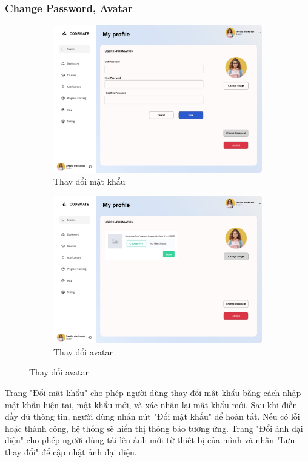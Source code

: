 \subsubsection{Change Password, Avatar}
\begin{figure}[H]
    \centering
    \begin{subfigure}[b]{0.45\linewidth}
        \centering
        \includegraphics[width=\linewidth]{Images/Anh/UI_change_pass.png}
        \caption{Thay đổi mật khẩu}
        \label{fig:enter-label1}
    \end{subfigure}
    \hfill
    \begin{subfigure}[b]{0.45\linewidth}
        \centering
        \includegraphics[width=\linewidth]{Images/Anh/UI_change_avatar.png}
        \caption{Thay đổi avatar}
        \label{fig:enter-label2}
    \end{subfigure}
    \label{fig:enter-label}
\end{figure}
Trang "Đổi mật khẩu" cho phép người dùng thay đổi mật khẩu bằng cách nhập mật khẩu hiện tại, mật khẩu mới, và xác nhận lại mật khẩu mới. Sau khi điền đầy đủ thông tin, người dùng nhấn nút "Đổi mật khẩu" để hoàn tất. Nếu có lỗi hoặc thành công, hệ thống sẽ hiển thị thông báo tương ứng. Trang "Đổi ảnh đại diện" cho phép người dùng tải lên ảnh mới từ thiết bị của mình và nhấn "Lưu thay đổi" để cập nhật ảnh đại diện.
